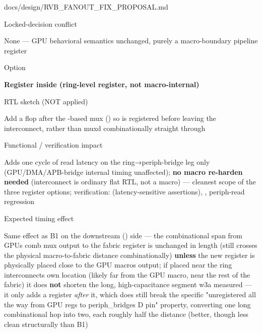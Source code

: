 \begin{relocated}{docs/design/RVB_FANOUT_FIX_PROPOSAL.md}
\begin{rowtable}
\begin{rowcell}{Locked-decision conflict}

None --- GPU behavioral semantics unchanged, purely a macro-boundary
pipeline register

\end{rowcell}


\begin{rowcell}{Option}

\textbf{Register  inside 
(ring-level register, not macro-internal)}

\end{rowcell}

\begin{rowcell}{RTL sketch (NOT applied)}

Add a flop after the -based mux
() so  is
registered before leaving the interconnect, rather than
mux\textquotesingle d combinationally straight through

\end{rowcell}

\begin{rowcell}{Functional / verification impact}

Adds one cycle of read latency on the ring→periph-bridge leg only
(GPU/\allowbreak{}DMA/\allowbreak{}APB-bridge internal timing
unaffected); \textbf{no macro re-harden needed} (interconnect is
ordinary flat RTL, not a macro) --- cleanest scope of the three register
options; verification: 
(latency-sensitive assertions), ,
 periph-read regression

\end{rowcell}

\begin{rowcell}{Expected timing effect}

Same effect as B1 on the downstream () side ---
the combinational span from GPU\textquotesingle s comb mux output to the
fabric register is unchanged in length (still crosses the physical
macro-to-fabric distance combinationally) \textbf{unless} the new
register is physically placed close to the GPU macro\textquotesingle s
output; if placed near the ring interconnect\textquotesingle s own
location (likely far from the GPU macro, near the rest of the fabric) it
does \textbf{not} shorten the long, high-capacitance segment w3a
measured --- it only adds a register \emph{after} it, which does still
break the specific "unregistered all the way from GPU regs to
periph\_\allowbreak{}bridge\textquotesingle s D pin" property,
converting one long combinational hop into two, each roughly half the
distance (better, though less clean structurally than B1)


\end{rowcell}
\end{rowtable}
\end{relocated}
